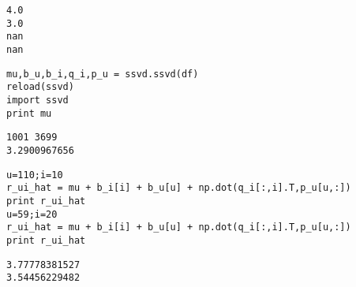 \documentclass[12pt,fleqn]{article}\usepackage{../common}
\begin{document}
\begin{verbatim}
4.0
3.0
nan
nan
\end{verbatim}


\begin{verbatim}
mu,b_u,b_i,q_i,p_u = ssvd.ssvd(df)
reload(ssvd)
import ssvd 
print mu
\end{verbatim}

\begin{verbatim}
1001 3699
3.2900967656
\end{verbatim}


\begin{verbatim}
u=110;i=10
r_ui_hat = mu + b_i[i] + b_u[u] + np.dot(q_i[:,i].T,p_u[u,:])
print r_ui_hat
u=59;i=20
r_ui_hat = mu + b_i[i] + b_u[u] + np.dot(q_i[:,i].T,p_u[u,:])
print r_ui_hat
\end{verbatim}

\begin{verbatim}
3.77778381527
3.54456229482
\end{verbatim}
\end{document}
